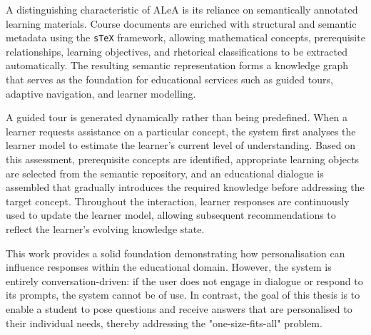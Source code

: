 A distinguishing characteristic of ALeA is its reliance on semantically annotated learning materials. Course documents are enriched with structural and semantic metadata using the \texttt{sTeX} framework, allowing mathematical concepts, prerequisite relationships, learning objectives, and rhetorical classifications to be extracted automatically. The resulting semantic representation forms a knowledge graph that serves as the foundation for educational services such as guided tours, adaptive navigation, and learner modelling.

A guided tour is generated dynamically rather than being predefined. When a learner requests assistance on a particular concept, the system first analyses the learner model to estimate the learner's current level of understanding. Based on this assessment, prerequisite concepts are identified, appropriate learning objects are selected from the semantic repository, and an educational dialogue is assembled that gradually introduces the required knowledge before addressing the target concept. Throughout the interaction, learner responses are continuously used to update the learner model, allowing subsequent recommendations to reflect the learner's evolving knowledge state.

This work provides a solid foundation demonstrating how personalisation can influence responses within the educational domain. However, the system is entirely conversation-driven: if the user does not engage in dialogue or respond to its prompts, the system cannot be of use. In contrast, the goal of this thesis is to enable a student to pose questions and receive answers that are personalised to their individual needs, thereby addressing the "one-size-fits-all" problem.